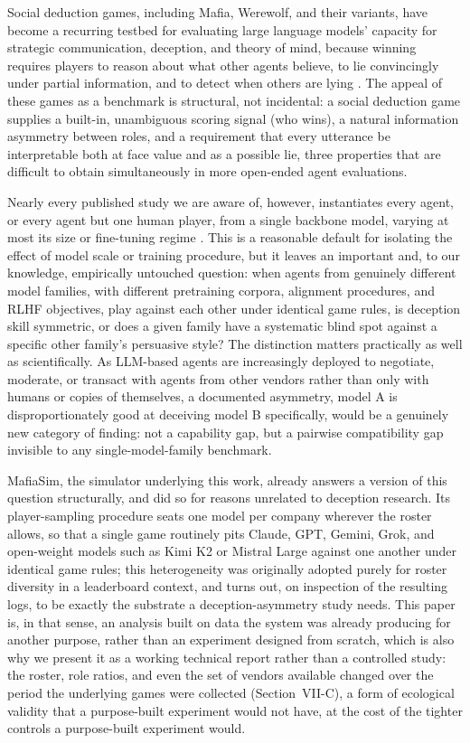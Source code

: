 \documentclass[10pt,conference]{IEEEtran}
\begin{document}
Social deduction games, including Mafia, Werewolf, and their variants, have become a recurring testbed for evaluating large language models' capacity for strategic communication, deception, and theory of mind, because winning requires players to reason about what other agents believe, to lie convincingly under partial information, and to detect when others are lying \cite{eckhaus2025time,feng2024survey,song2025beyond}. The appeal of these games as a benchmark is structural, not incidental: a social deduction game supplies a built-in, unambiguous scoring signal (who wins), a natural information asymmetry between roles, and a requirement that every utterance be interpretable both at face value and as a possible lie, three properties that are difficult to obtain simultaneously in more open-ended agent evaluations.

Nearly every published study we are aware of, however, instantiates every agent, or every agent but one human player, from a single backbone model, varying at most its size or fine-tuning regime \cite{eckhaus2025time,zhang2025dvm,mittal2026triadic}. This is a reasonable default for isolating the effect of model scale or training procedure, but it leaves an important and, to our knowledge, empirically untouched question: when agents from genuinely different model families, with different pretraining corpora, alignment procedures, and RLHF objectives, play against each other under identical game rules, is deception skill symmetric, or does a given family have a systematic blind spot against a specific other family's persuasive style? The distinction matters practically as well as scientifically. As LLM-based agents are increasingly deployed to negotiate, moderate, or transact with agents from other vendors rather than only with humans or copies of themselves, a documented asymmetry, model A is disproportionately good at deceiving model B specifically, would be a genuinely new category of finding: not a capability gap, but a pairwise compatibility gap invisible to any single-model-family benchmark.

MafiaSim, the simulator underlying this work, already answers a version of this question structurally, and did so for reasons unrelated to deception research. Its player-sampling procedure seats one model per company wherever the roster allows, so that a single game routinely pits Claude, GPT, Gemini, Grok, and open-weight models such as Kimi K2 or Mistral Large against one another under identical game rules; this heterogeneity was originally adopted purely for roster diversity in a leaderboard context, and turns out, on inspection of the resulting logs, to be exactly the substrate a deception-asymmetry study needs. This paper is, in that sense, an analysis built on data the system was already producing for another purpose, rather than an experiment designed from scratch, which is also why we present it as a working technical report rather than a controlled study: the roster, role ratios, and even the set of vendors available changed over the period the underlying games were collected (Section~VII-C), a form of ecological validity that a purpose-built experiment would not have, at the cost of the tighter controls a purpose-built experiment would.
\end{document}
